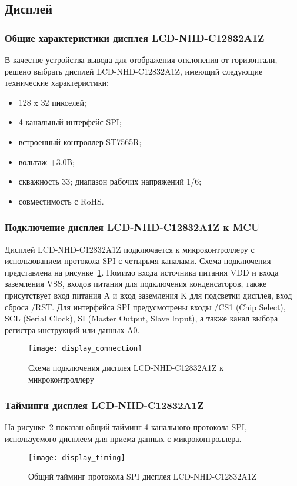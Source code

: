 \documentclass[document.tex]{subfiles}
\begin{document}
\clearpage
\subsection{Дисплей}
\subsubsection{Общие характеристики дисплея LCD-NHD-C12832A1Z}
В качестве устройства вывода для отображения отклонения от горизонтали, решено выбрать дисплей LCD-NHD-C12832A1Z, имеющий следующие техни\-ческие характеристики:
\begin{itemize}
	\item 128 x 32 пикселей;
	\item 4-канальный интерфейс SPI;
	\item встроенный контроллер ST7565R;
	\item вольтаж +3.0В;
	\item скважность 33; диапазон рабочих напряжений 1/6;
	\item совместимость с RoHS.\cite{display}
\end{itemize}

\clearpage
\subsubsection{Подключение дисплея LCD-NHD-C12832A1Z к MCU}
Дисплей LCD-NHD-C12832A1Z подключается к микроконтроллеру с исполь\-зованием про\-токола SPI с четырьмя каналами. Схема подключения представ\-лена на
рисунке~\ref{fig:display_connection}. Помимо входа источника питания VDD и входа заземления VSS, входов питания для подключения конденсаторов, также присутствует вход питания A и
вход заземления K для подсветки дисплея, вход сброса /RST. Для интерфейса SPI предусмотрены входы /CS1 (Chip Select), SCL (Serial Clock), SI (Master Output, Slave Input), а также
канал выбора регистра инструкций или данных A0.\cite{display, lcd_interfaces}

\begin{figure}[h]
\centering
\texttt{[image: display\_connection]}
\caption{Схема подключения дисплея LCD-NHD-C12832A1Z к микроконтроллеру}
\label{fig:display_connection}
\end{figure}

\clearpage
\subsubsection{Тайминги дисплея LCD-NHD-C12832A1Z}
На рисунке~\ref{fig:display_timing} показан общий тайминг 4-канального протокола SPI, исполь\-зуемого дисплеем для приема данных с микроконтроллера.
\begin{figure}[h]
\centering
\texttt{[image: display\_timing]}
\caption{Общий тайминг протокола SPI дисплея LCD-NHD-C12832A1Z}
\label{fig:display_timing}
\end{figure}
\end{document}
